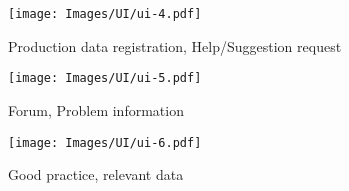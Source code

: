 
\begin{figure}[H]
	\centering
    \texttt{[image: Images/UI/ui-4.pdf]}
	\caption{\label{fig:bpmn_sign_up}Production data registration, Help/Suggestion request}
\end{figure}
\newpage
\begin{figure}[H]
	\centering
    \texttt{[image: Images/UI/ui-5.pdf]}
	\caption{\label{fig:bpmn_sign_up}Forum, Problem information}
\end{figure}

\begin{figure}[H]
	\centering
    \texttt{[image: Images/UI/ui-6.pdf]}
	\caption{\label{fig:bpmn_sign_up}Good practice, relevant data}
\end{figure}